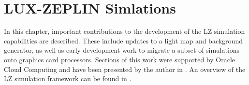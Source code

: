 \chapter{LUX-ZEPLIN Simlations}
\par
In this chapter, important contributions to the development of the LZ simulation capabilities are described.
These include updates to a light map and background generator, as well as early development work to migrate a subset of simulations onto graphics card processors.
Sections of this work were supported by Oracle Cloud Computing and have been presented by the author in \cite{se_poster_2018,se_poster_2019_summerschool,se_poster_2019_bristol,SEriksen_IoP_2021_talk_ref}.
An overview of the LZ simulation framework can be found in \cite{lz_simulations_ref}.





